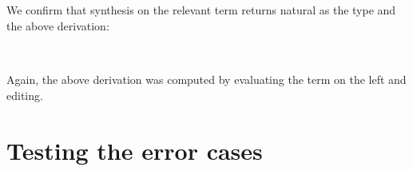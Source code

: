 \begin{fence}
\begin{code}
\AgdaSpace{}%
\AgdaSpace{}%
\AgdaSymbol{(}\AgdaSpace{}%
\AgdaSymbol{)}\AgdaSpace{}%
\AgdaSymbol{)}\<%
\\
%
\>[5]\AgdaSymbol{)}\<%
\\
%
\>[4]\AgdaSymbol{))}\<%
\\
%
\>[2]\AgdaSpace{}%
\AgdaSpace{}%
\AgdaSymbol{(}\AgdaSpace{}%
\AgdaSymbol{(}\AgdaSpace{}%
\AgdaSymbol{(}\AgdaSpace{}%
\AgdaSymbol{)}\AgdaSpace{}%
\AgdaSymbol{))}\<%
\\
%
\>[2]\AgdaSpace{}%
\<%
\end{code}
\end{fence}

We confirm that synthesis on the relevant term returns natural as the
type and the above derivation:

\begin{fence}
\begin{code}%
\>[0]\AgdaFunction{\AgdaUnderscore{}}\AgdaSpace{}%
\AgdaSymbol{:}\AgdaSpace{}%
\AgdaSpace{}%
\AgdaSpace{}%
\AgdaSpace{}%
\AgdaSpace{}%
\AgdaSpace{}%
\AgdaSpace{}%
\AgdaSpace{}%
\AgdaOperator{\AgdaInductiveConstructor{,}}\AgdaSpace{}%
\AgdaSpace{}%
\<%
\\
\>[0]\AgdaSymbol{\AgdaUnderscore{}}\AgdaSpace{}%
\AgdaSymbol{=}\AgdaSpace{}%
\<%
\end{code}
\end{fence}

Again, the above derivation was computed by evaluating the term on the
left and editing.

\hypertarget{testing-the-error-cases}{%
\section{Testing the error cases}\label{testing-the-error-cases}}

